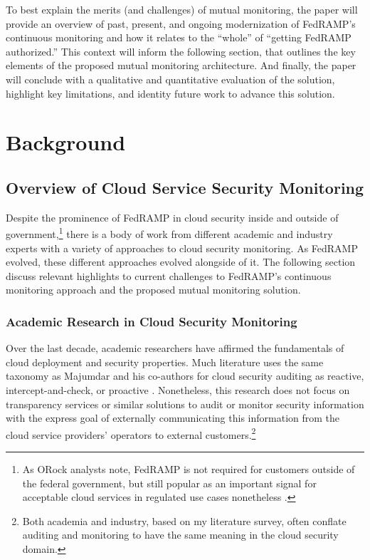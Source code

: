 \documentclass{jdf}
\begin{document}
To best explain the merits (and challenges) of mutual monitoring, the paper will provide an overview of past, present, and ongoing modernization of FedRAMP's continuous monitoring and how it relates to the ``whole'' of ``getting FedRAMP authorized.'' This context will inform the following section, that outlines the key elements of the proposed mutual monitoring architecture. And finally, the paper will conclude with a qualitative and quantitative evaluation of the solution, highlight key limitations, and identity future work to advance this solution.

\section{Background}

\subsection{Overview of Cloud Service Security Monitoring}

Despite the prominence of FedRAMP in cloud security inside and outside of government,\footnote{As ORock analysts note, FedRAMP is not required for customers outside of the federal government, but still popular as an important signal for acceptable cloud services in regulated use cases nonetheless \citeyear{orock21}.} there is a body of work from different academic and industry experts with a variety of approaches to cloud security monitoring. As FedRAMP evolved, these different approaches evolved alongside of it. The following section discuss relevant highlights to current challenges to FedRAMP's continuous monitoring approach and the proposed mutual monitoring solution.

\subsubsection{Academic Research in Cloud Security Monitoring}

Over the last decade, academic researchers have affirmed the fundamentals of cloud deployment and security properties. Much literature uses the same taxonomy as Majumdar and his co-authors for cloud security auditing as reactive, intercept-and-check, or proactive \citeyear[pp.~9-13]{majumdar19}. Nonetheless, this research does not focus on transparency services or similar solutions to audit or monitor security information with the express goal of externally communicating this information from the cloud service providers' operators to external customers.\footnote{Both academia and industry, based on my literature survey, often conflate auditing and monitoring to have the same meaning in the cloud security domain.}
\end{document}
